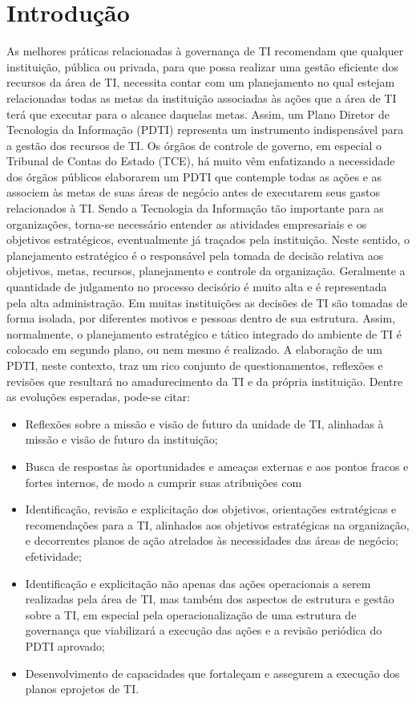 \documentclass[        
    a4paper,          %
    12pt,             %
    chapter=TITLE,    %
    section=Title,    %
    subsection=Title, %
    oneside,          %
    english,          %
    spanish,          %
    brazil,           %
    sumario=abnt-6027-2012,
]{abntex2}
\begin{document}
\section{Introdução}
As melhores práticas relacionadas à governança de TI recomendam que qualquer
instituição, pública ou privada, para que possa realizar uma gestão eficiente dos recursos da área
de TI, necessita contar com um planejamento no qual estejam relacionadas todas as metas da
instituição associadas às ações que a área de TI terá que executar para o alcance daquelas metas.
Assim, um Plano Diretor de Tecnologia da Informação (PDTI) representa um instrumento
indispensável para a gestão dos recursos de TI. Os órgãos de controle de governo, em especial o
Tribunal de Contas do Estado (TCE), há muito vêm enfatizando a necessidade dos órgãos públicos
elaborarem um PDTI que contemple todas as ações e as associem às metas de suas áreas de
negócio antes de executarem seus gastos relacionados à TI.
Sendo a Tecnologia da Informação tão importante para as organizações, torna-se
necessário entender as atividades empresariais e os objetivos estratégicos, eventualmente já
traçados pela instituição. Neste sentido, o planejamento estratégico é o responsável pela tomada
de decisão relativa aos objetivos, metas, recursos, planejamento e controle da organização.
Geralmente a quantidade de julgamento no processo decisório é muito alta e é representada pela
alta administração.
Em muitas instituições as decisões de TI são tomadas de forma isolada, por diferentes
motivos e pessoas dentro de sua estrutura. Assim, normalmente, o planejamento estratégico e
tático integrado do ambiente de TI é colocado em segundo plano, ou nem mesmo é realizado.
A elaboração de um PDTI, neste contexto, traz um rico conjunto de questionamentos,
reflexões e revisões que resultará no amadurecimento da TI e da própria instituição. Dentre as
evoluções esperadas, pode-se citar:
\begin{itemize}
 \item Reflexões sobre a missão e visão de futuro da unidade de TI, alinhadas à missão e visão de futuro da instituição;
 \item Busca de respostas às oportunidades e ameaças externas e aos pontos fracos e fortes internos, de modo a cumprir suas atribuições com 
 \item Identificação, revisão e explicitação dos objetivos, orientações estratégicas e recomendações para a TI, alinhados aos 
objetivos estratégicas na organização, e decorrentes planos de ação atrelados às necessidades das áreas de negócio; efetividade;
 \item Identificação e explicitação não apenas das ações operacionais a serem realizadas pela área de TI, mas também dos aspectos de 
estrutura e gestão sobre a TI, em especial pela operacionalização de uma estrutura de governança que viabilizará a execução das ações e
a revisão periódica do PDTI aprovado;
 \item Desenvolvimento de capacidades que fortaleçam e assegurem a execução dos planos eprojetos de TI. 
\end{itemize}
\end{document}
